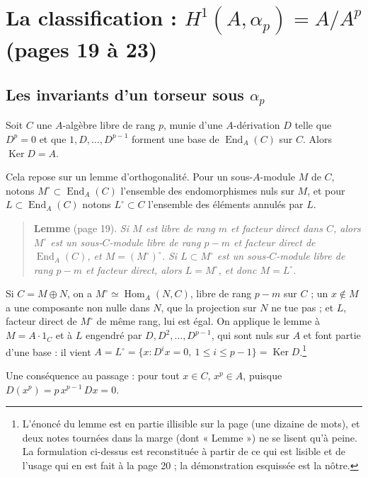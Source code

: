 \documentclass[11pt,a4paper]{article}
\begin{document}
\section*{La classification : $H^1(A, \alpha_p) = A/A^p$ (pages 19 à 23)}

\subsection*{Les invariants d'un torseur sous $\alpha_p$}

Soit $C$ une $A$-algèbre libre de rang $p$, munie d'une $A$-dérivation $D$
telle que $D^p = 0$ et que $1, D, \ldots, D^{p-1}$ forment une base de
$\operatorname{End}_A(C)$ sur $C$. Alors \emph{$\operatorname{Ker} D = A$}.

Cela repose sur un lemme d'orthogonalité. Pour un sous-$A$-module $M$ de $C$,
notons $M^{\circ} \subset \operatorname{End}_A(C)$ l'ensemble des
endomorphismes nuls sur $M$, et pour $L \subset \operatorname{End}_A(C)$
notons $L^{\circ} \subset C$ l'ensemble des éléments annulés par $L$.

\begin{quote}
\textbf{Lemme} (page 19). \emph{Si $M$ est libre de rang $m$ et facteur
direct dans $C$, alors $M^{\circ}$ est un sous-$C$-module libre de rang $p - m$
et facteur direct de $\operatorname{End}_A(C)$, et $M = (M^{\circ})^{\circ}$.
Si $L \subset M^{\circ}$ est un sous-$C$-module libre de rang $p - m$ et
facteur direct, alors $L = M^{\circ}$, et donc $M = L^{\circ}$.}
\end{quote}

Si $C = M \oplus N$, on a $M^{\circ} \simeq \operatorname{Hom}_A(N, C)$, libre
de rang $p - m$ sur $C$ ; un $x \notin M$ a une composante non nulle dans
$N$, que la projection sur $N$ ne tue pas ; et $L$, facteur direct de
$M^{\circ}$ de même rang, lui est égal. On applique le lemme à $M = A \cdot
1_C$ et à $L$ engendré par $D, D^2, \ldots, D^{p-1}$, qui sont nuls sur $A$ et
font partie d'une base : il vient
$A = L^{\circ} = \{x : D^i x = 0,\ 1 \le i \le p-1\} = \operatorname{Ker}
D$.\footnote{L'énoncé du lemme est en partie illisible sur la page (une
dizaine de mots), et deux notes tournées dans la marge (dont « Lemme ») ne
se lisent qu'à peine. La formulation ci-dessus est reconstituée à partir de
ce qui est lisible et de l'usage qui en est fait à la page 20 ; la
démonstration esquissée est la nôtre.}

Une conséquence au passage : pour tout $x \in C$, $x^p \in A$, puisque
$D(x^p) = p\,x^{p-1}\,Dx = 0$.
\end{document}
